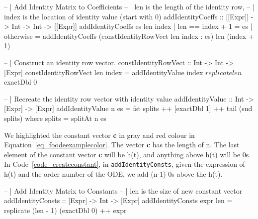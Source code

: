 \begin{listing}[ht]
\begin{haskell1}
-- | Add Identity Matrix to Coefficients
-- | len is the length of the identity row,
-- | index is the location of identity value (start with 0)
addIdentityCoeffs :: [[Expr]] -> Int -> Int -> [[Expr]]
addIdentityCoeffs es len index
  | len == index + 1 = es
  | otherwise = addIdentityCoeffs (constIdentityRowVect len index : es) len (index + 1)

-- | Construct an identity row vector.
constIdentityRowVect :: Int -> Int -> [Expr]
constIdentityRowVect len index = addIdentityValue index $ replicate len $ exactDbl 0

-- | Recreate the identity row vector with identity value 
addIdentityValue :: Int -> [Expr] -> [Expr]
addIdentityValue n es = fst splits ++ [exactDbl 1] ++ tail (snd splits)
  where splits = splitAt n es
\end{haskell1}
\label{code_createidentity}
\end{listing}

We highlighted the constant vector \textbf{c} in gray and red colour in Equation~\ref{eq_foodeexamplecolor}. The vector \textbf{c} has the length of n. The last element of the constant vector \textbf{c} will be h(t), and anything above h(t) will be 0s. In Code~\ref{code_createconstant}, in \verb|addIdentityConsts|, given the expression of h(t) and the order number of the ODE, we add (n-1) 0s above the h(t). 

\begin{listing}[ht]
\begin{haskell1}
-- | Add Identity Matrix to Constants
-- | len is the size of new constant vector
addIdentityConsts :: [Expr] -> Int -> [Expr]
addIdentityConsts expr len = replicate (len - 1) (exactDbl 0) ++ expr
\end{haskell1}
\label{code_createconstant}
\end{listing}

